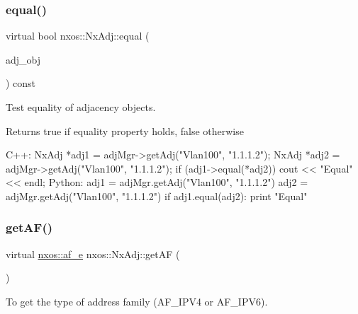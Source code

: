\subsubsection{\texorpdfstring{equal()}{equal()}}
{\footnotesize\ttfamily virtual bool nxos\+::\+Nx\+Adj\+::equal (\begin{DoxyParamCaption}\item[{\mbox{\hyperlink{classnxos_1_1_nx_adj}{Nx\+Adj}} const \&}]{adj\+\_\+obj }\end{DoxyParamCaption}) const\hspace{0.3cm}{\ttfamily [pure virtual]}}

Test equality of adjacency objects.

\begin{DoxyReturn}{Returns}
true if equality property holds, false otherwise
\end{DoxyReturn}

\begin{DoxyCode}
C++:
    NxAdj *adj1 = adjMgr->getAdj(\textcolor{stringliteral}{"Vlan100"}, \textcolor{stringliteral}{"1.1.1.2"});
    NxAdj *adj2 = adjMgr->getAdj(\textcolor{stringliteral}{"Vlan100"}, \textcolor{stringliteral}{"1.1.1.2"});
    \textcolor{keywordflow}{if} (adj1->equal(*adj2))
        cout << \textcolor{stringliteral}{"Equal"} << endl;
Python:
    adj1 = adjMgr.getAdj(\textcolor{stringliteral}{"Vlan100"}, \textcolor{stringliteral}{"1.1.1.2"})
    adj2 = adjMgr.getAdj(\textcolor{stringliteral}{"Vlan100"}, \textcolor{stringliteral}{"1.1.1.2"})
    \textcolor{keywordflow}{if} adj1.equal(adj2):
         print \textcolor{stringliteral}{"Equal"}
\end{DoxyCode}
 \mbox{\label{classnxos_1_1_nx_adj_a5e026c5187f3a88337790ad5d7cb4e5b}} 
\subsubsection{\texorpdfstring{get\+A\+F()}{getAF()}}
{\footnotesize\ttfamily virtual \mbox{\hyperlink{nx__common_8h_a3a667f48b94db10aa398940dc5bf72d7}{nxos\+::af\+\_\+e}} nxos\+::\+Nx\+Adj\+::get\+AF (\begin{DoxyParamCaption}{ }\end{DoxyParamCaption})\hspace{0.3cm}{\ttfamily [pure virtual]}}

To get the type of address family (A\+F\+\_\+\+I\+P\+V4 or A\+F\+\_\+\+I\+P\+V6).


